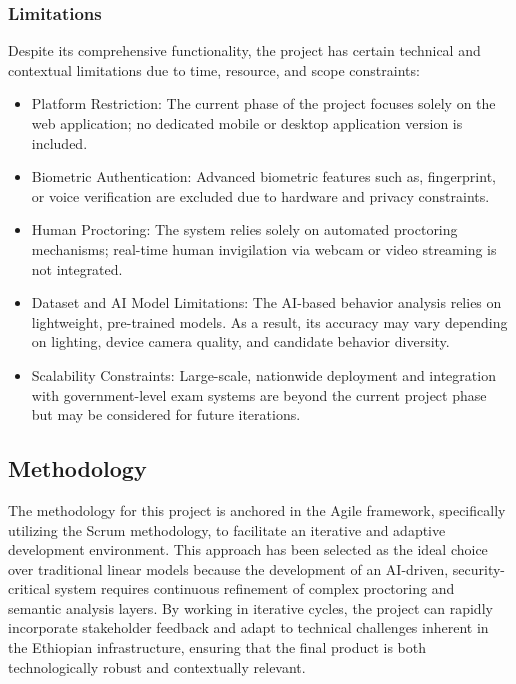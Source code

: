 \subsubsection{Limitations}
Despite its comprehensive functionality, the project has certain technical and contextual limitations due to time, resource, and scope constraints:
\begin{sloppypar}
\begin{itemize}
    \item Platform Restriction: The current phase of the project focuses solely on the web application; no dedicated mobile or desktop application  version is included.
    \item Biometric Authentication: Advanced biometric features such as, fingerprint, or voice verification are excluded due to hardware and privacy constraints.
    \item Human Proctoring: The system relies solely on automated proctoring mechanisms; real-time human invigilation via webcam or video streaming is not integrated.
    \item Dataset and AI Model Limitations: The AI-based behavior analysis relies on lightweight, pre-trained models. As a result, its accuracy may vary depending on lighting, device camera quality, and candidate behavior diversity.
    \item Scalability Constraints: Large-scale, nationwide deployment and integration with government-level exam systems are beyond the current project phase but may be considered for future iterations.
\end{itemize}
\end{sloppypar}

\subsection{Methodology}
The methodology for this project is anchored in the Agile framework, specifically utilizing the Scrum methodology, to facilitate an iterative and adaptive development environment. This approach has been selected as the ideal choice over traditional linear models because the development of an AI-driven, security-critical system requires continuous refinement of complex proctoring and semantic analysis layers. By working in iterative cycles, the project can rapidly incorporate stakeholder feedback and adapt to technical challenges inherent in the Ethiopian infrastructure, ensuring that the final product is both technologically robust and contextually relevant.

